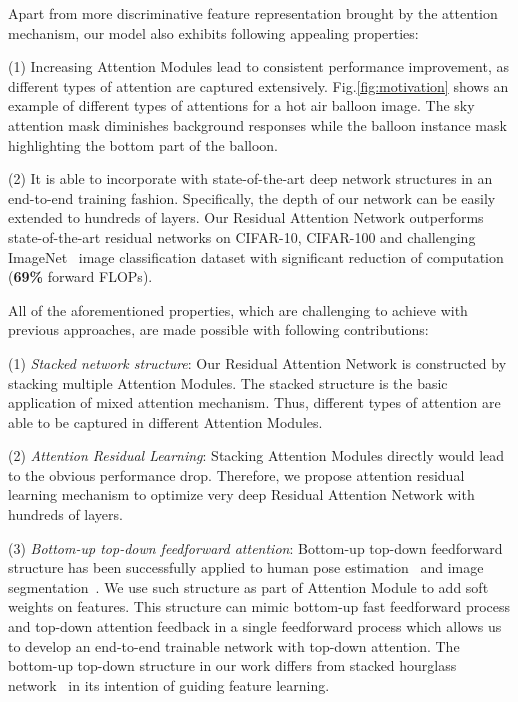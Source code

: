 \documentclass[10pt,twocolumn,letterpaper]{article}
\begin{document}
Apart from more discriminative feature representation brought by the attention mechanism, our model also exhibits following appealing properties:

\noindent
(1) Increasing Attention Modules lead to consistent performance improvement, as different types of attention are captured extensively. Fig.\ref{fig:motivation} shows an example of different types of attentions for a hot air balloon image. The sky attention mask diminishes background responses while the balloon instance mask highlighting the bottom part of the balloon.

\noindent
(2) It is able to incorporate with state-of-the-art deep network structures in an end-to-end training fashion. Specifically, the depth of our network can be easily extended to hundreds of layers. Our Residual Attention Network outperforms state-of-the-art residual networks on CIFAR-10, CIFAR-100 and challenging ImageNet~\cite{deng2009imagenet} image classification dataset with significant reduction of computation (\textbf{69\%} forward FLOPs).

All of the aforementioned properties, which are challenging to achieve with previous approaches, are made possible with following contributions:

\noindent
(1) \textit{Stacked network structure}: Our Residual Attention Network is constructed by stacking multiple Attention Modules. The stacked structure is the basic application of mixed attention mechanism. Thus, different types of attention are able to be captured in different Attention Modules.
%

\noindent
(2) \textit{Attention Residual Learning}: Stacking Attention Modules directly would lead to the obvious performance drop. Therefore, we propose attention residual learning mechanism to optimize very deep Residual Attention Network with hundreds of layers. %

\noindent
(3) \textit{Bottom-up top-down feedforward attention}: Bottom-up top-down feedforward structure has been successfully applied to human pose estimation~\cite{newell2016stacked} and image segmentation~\cite{long2015fully,noh2015learning,badrinarayanan2015segnet}. We use such structure as part of Attention Module to add soft weights on features. This structure can mimic bottom-up fast feedforward process and top-down attention feedback in a single feedforward process which allows us to develop an end-to-end trainable network with top-down attention. The bottom-up top-down structure in our work differs from stacked hourglass network~\cite{newell2016stacked} in its intention of guiding feature learning.
\end{document}
